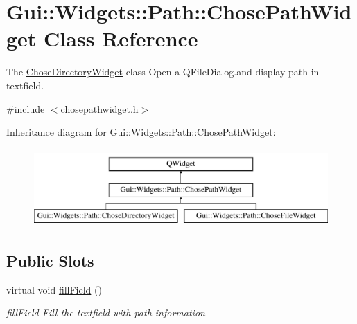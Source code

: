 \hypertarget{classGui_1_1Widgets_1_1Path_1_1ChosePathWidget}{\section{Gui\-:\-:Widgets\-:\-:Path\-:\-:Chose\-Path\-Widget Class Reference}
\label{classGui_1_1Widgets_1_1Path_1_1ChosePathWidget}
}


The \hyperlink{classGui_1_1Widgets_1_1Path_1_1ChoseDirectoryWidget}{Chose\-Directory\-Widget} class Open a Q\-File\-Dialog.\-and display path in textfield.  




{\ttfamily \#include $<$chosepathwidget.\-h$>$}

Inheritance diagram for Gui\-:\-:Widgets\-:\-:Path\-:\-:Chose\-Path\-Widget\-:\begin{figure}[H]
\begin{center}
\leavevmode
\includegraphics[height=3.000000cm]{db/de6/classGui_1_1Widgets_1_1Path_1_1ChosePathWidget}
\end{center}
\end{figure}
\subsection*{Public Slots}
\begin{DoxyCompactItemize}
\item 
\hypertarget{classGui_1_1Widgets_1_1Path_1_1ChosePathWidget_aea561fda3f9be03e9454f7af62683da7}{virtual void \hyperlink{classGui_1_1Widgets_1_1Path_1_1ChosePathWidget_aea561fda3f9be03e9454f7af62683da7}{fill\-Field} ()}\label{classGui_1_1Widgets_1_1Path_1_1ChosePathWidget_aea561fda3f9be03e9454f7af62683da7}

\begin{DoxyCompactList}\small\item\em fill\-Field Fill the textfield with path information \end{DoxyCompactList}\end{DoxyCompactItemize}
